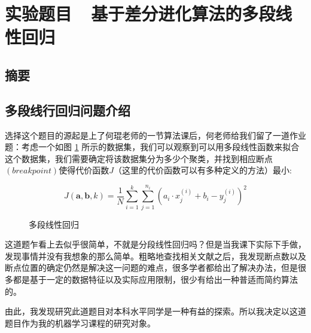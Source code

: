 \section{实验题目\ \ 基于差分进化算法的多段线性回归}
\subsection{摘要}


\subsection{多段线行回归问题介绍}

选择这个题目的源起是上了何琨老师的一节算法课后，何老师给我们留了一道作业题：考虑一个如图 \ref{chapter1example} 所示的数据集，我们可以观察到可以用多段线性函数来拟合这个数据集，我们需要确定将该数据集分为多少个聚类，并找到相应断点$(breakpoint)$使得代价函数$J$（这里的代价函数可以有多种定义的方法）最小:

\[J(\bm{a}, \bm{b}, k) = \frac{1}{N}\sum\limits_{i=1}^k \sum\limits_{j=1}^{n_i}(a_i\cdot x_j^{(i)}+b_i - y_j^{(i)})^2\]

\begin{figure}[H]
    \caption{多段线性回归}
    \label{chapter1example}      
\end{figure}


这道题乍看上去似乎很简单，不就是分段线性回归吗？但是当我课下实际下手做，发现事情并没有我想象的那么简单。粗略地查找相关文献之后，我发现断点数以及断点位置的确定仍然是解决这一问题的难点，很多学者都给出了解决办法，但是很多都是基于一定的数据特征以及实际应用限制，很少有给出一种普适而简约算法的。

由此，我发现研究此道题目对本科水平同学是一种有益的探索。所以我决定以这道题目作为我的机器学习课程的研究对象。

